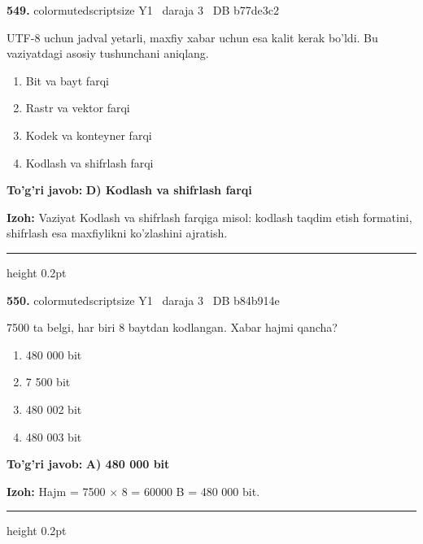 \documentclass[10pt,a4paper,oneside]{article}
\begin{document}
\noindent\textbf{\color{ink}549.}  {color{muted}scriptsize Y1 \textbullet\ daraja 3 \textbullet\ DB b77de3c2}
\par
UTF-8 uchun jadval yetarli, maxfiy xabar uchun esa kalit kerak bo'ldi. Bu vaziyatdagi asosiy tushunchani aniqlang.
\begin{enumerate}[label=\Alph*),leftmargin=9mm]
\item Bit va bayt farqi
\item Rastr va vektor farqi
\item Kodek va konteyner farqi
\item Kodlash va shifrlash farqi
\end{enumerate}
\begin{tcolorbox}[enhanced,breakable,colback=teal!4,colframe=teal!50!black,boxrule=0.5pt,arc=1.1mm,left=3mm,right=3mm,top=1.7mm,bottom=1.7mm,before skip=2mm,after skip=2mm]
\textbf{\color{teal}To'g'ri javob:} \textbf{D) Kodlash va shifrlash farqi}
\par\smallskip
\textbf{Izoh:} Vaziyat Kodlash va shifrlash farqiga misol: kodlash taqdim etish formatini, shifrlash esa maxfiylikni ko'zlashini ajratish.
\end{tcolorbox}
\vspace{2mm}\hrule height 0.2pt \vspace{3mm}

\noindent\textbf{\color{ink}550.}  {color{muted}scriptsize Y1 \textbullet\ daraja 3 \textbullet\ DB b84b914e}
\par
7500 ta belgi, har biri 8 baytdan kodlangan. Xabar hajmi qancha?
\begin{enumerate}[label=\Alph*),leftmargin=9mm]
\item 480 000 bit
\item 7 500 bit
\item 480 002 bit
\item 480 003 bit
\end{enumerate}
\begin{tcolorbox}[enhanced,breakable,colback=teal!4,colframe=teal!50!black,boxrule=0.5pt,arc=1.1mm,left=3mm,right=3mm,top=1.7mm,bottom=1.7mm,before skip=2mm,after skip=2mm]
\textbf{\color{teal}To'g'ri javob:} \textbf{A) 480 000 bit}
\par\smallskip
\textbf{Izoh:} Hajm = 7500 \ensuremath{\times} 8 = 60000 B = 480 000 bit.
\end{tcolorbox}
\vspace{2mm}\hrule height 0.2pt \vspace{3mm}
\end{document}
